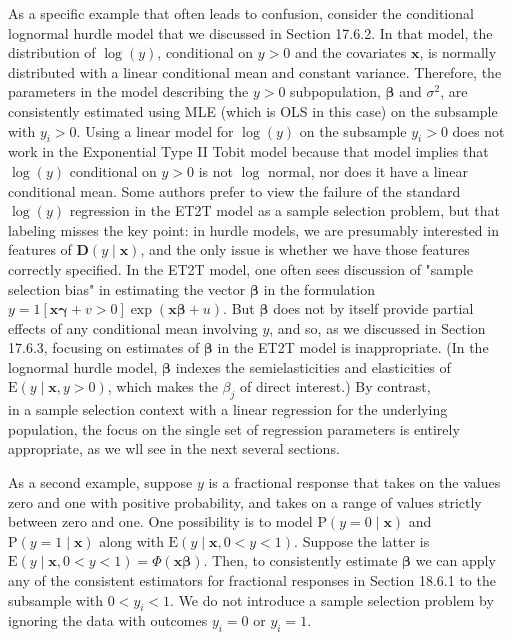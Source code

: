 \documentclass[10pt]{article}
\begin{document}
As a specific example that often leads to confusion, consider the conditional lognormal hurdle model that we discussed in Section 17.6.2. In that model, the distribution of $\log (y)$, conditional on $y>0$ and the covariates $\mathbf{x}$, is normally distributed with a linear conditional mean and constant variance. Therefore, the parameters in the model describing the $y>0$ subpopulation, $\boldsymbol{\beta}$ and $\sigma^{2}$, are consistently estimated using MLE (which is OLS in this case) on the subsample with $y_{i}>0$. Using a linear model for $\log (y)$ on the subsample $y_{i}>0$ does not work in the Exponential Type II Tobit model because that model implies that $\log (y)$ conditional on $y>0$ is not $\log$ normal, nor does it have a linear conditional mean. Some authors prefer to view the failure of the standard $\log (y)$ regression in the ET2T model as a sample selection problem, but that labeling misses the key point: in hurdle models, we are presumably interested in features of $\mathbf{D}(y \mid \mathbf{x})$, and the only issue is whether we have those features correctly specified. In the ET2T model, one often sees discussion of "sample selection bias" in estimating the vector $\boldsymbol{\beta}$ in the formulation $y=1[\mathbf{x} \boldsymbol{\gamma}+v>0] \exp (\mathbf{x} \boldsymbol{\beta}+u)$. But $\boldsymbol{\beta}$ does not by itself provide partial effects of any conditional mean involving $y$, and so, as we discussed in Section 17.6.3, focusing on estimates of $\boldsymbol{\beta}$ in the ET2T model is inappropriate. (In the lognormal hurdle model, $\boldsymbol{\beta}$ indexes the semielasticities and elasticities of $\mathrm{E}(y \mid \mathbf{x}, y>0)$, which makes the $\beta_{j}$ of direct interest.) By contrast,\\
in a sample selection context with a linear regression for the underlying population, the focus on the single set of regression parameters is entirely appropriate, as we wll see in the next several sections.

As a second example, suppose $y$ is a fractional response that takes on the values zero and one with positive probability, and takes on a range of values strictly between zero and one. One possibility is to model $\mathrm{P}(y=0 \mid \mathbf{x})$ and $\mathrm{P}(y=1 \mid \mathbf{x})$ along with $\mathrm{E}(y \mid \mathbf{x}, 0<y<1)$. Suppose the latter is $\mathrm{E}(y \mid \mathbf{x}, 0<y<1)=\Phi(\mathbf{x} \boldsymbol{\beta})$. Then, to consistently estimate $\boldsymbol{\beta}$ we can apply any of the consistent estimators for fractional responses in Section 18.6.1 to the subsample with $0<y_{i}<1$. We do not introduce a sample selection problem by ignoring the data with outcomes $y_{i}=0$ or $y_{i}=1$.
\end{document}
